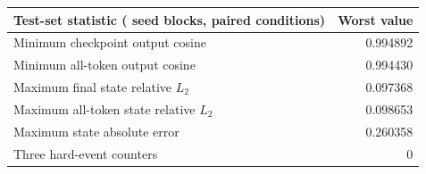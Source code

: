 \begin{tabular}{lr}
\toprule
Test-set statistic (\CorrectedHeldoutSeedBlocks{} seed blocks, \CorrectedHeldoutPairedConditions{} paired conditions) & Worst value \\
\midrule
Minimum checkpoint output cosine & 0.994892 \\
Minimum all-token output cosine & 0.994430 \\
Maximum final state relative $L_2$ & 0.097368 \\
Maximum all-token state relative $L_2$ & 0.098653 \\
Maximum state absolute error & 0.260358 \\
Three hard-event counters & 0 \\
\bottomrule
\end{tabular}
